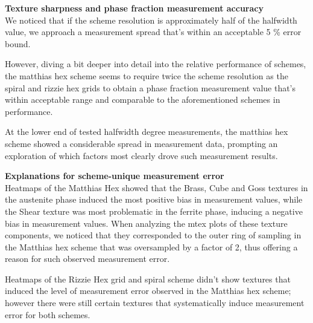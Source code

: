 \documentclass{article}
\begin{document}








\textbf{Texture sharpness and phase fraction measurement accuracy}\\

We noticed that if the scheme resolution is approximately half of the halfwidth value, we approach a measurement spread that's within an acceptable 5 \% error bound. 

However, diving a bit deeper into detail into the relative performance of schemes, the matthias hex scheme seems to require twice the scheme resolution as the spiral and rizzie hex grids to obtain a phase fraction measurement value that's within acceptable range and comparable to the aforementioned schemes in performance.

At the lower end of tested halfwidth degree measurements, the matthias hex scheme showed a considerable spread in measurement data, prompting an exploration of which factors most clearly drove such measurement results. 

\textbf{Explanations for scheme-unique measurement error}\\

Heatmaps of the Matthias Hex showed that the Brass, Cube and Goss textures in the austenite phase induced the most positive bias in measurement values, while the Shear texture was most problematic in the ferrite phase, inducing a negative bias in measurement values. When analyzing the mtex plots of these texture components, we noticed that they corresponded to the outer ring of sampling in the Matthias hex scheme that was oversampled by a factor of 2, thus offering a reason for such observed measurement error.

Heatmaps of the Rizzie Hex grid and spiral scheme didn't show textures that induced the level of measurement error observed in the Matthias hex scheme; however there were still certain textures that systematically induce measurement error for both schemes.
\end{document}
